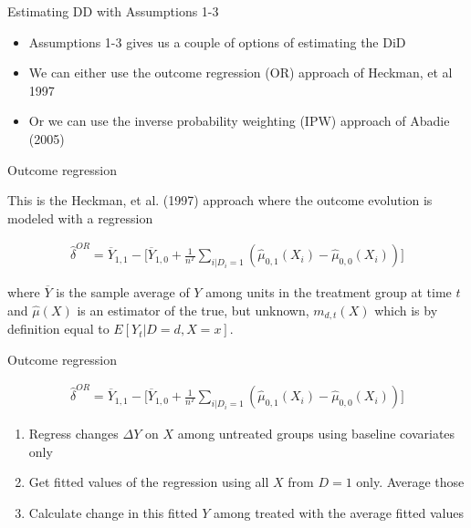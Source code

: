 \documentclass{beamer}
\begin{document}
\begin{frame}{Estimating DD with Assumptions 1-3}

\begin{itemize}
\item Assumptions 1-3 gives us a couple of options of estimating the DiD
\item We can either use the outcome regression (OR) approach of Heckman, et al 1997
\item Or we can use the inverse probability weighting (IPW) approach of Abadie (2005)
\end{itemize}

\end{frame}


\begin{frame}{Outcome regression}

This is the Heckman, et al. (1997) approach where the outcome evolution is modeled with a regression

\bigskip

\begin{eqnarray*}
\widehat{\delta}^{OR} = \overline{Y}_{1,1} - \bigg [ \overline{Y}_{1,0} + \frac{1}{n^T} \sum_{i|D_i=1} ( \widehat{\mu}_{0,1}(X_i) - \widehat{\mu}_{0,0}(X_i)) \bigg ]
\end{eqnarray*}

where $\overline{Y}$ is the sample average of $Y$ among units in the treatment group at time $t$ and $\widehat{\mu}(X)$ is an estimator of the true, but unknown, $m_{d,t}(X)$ which is by definition equal to $E[Y_t|D=d,X=x]$.

\end{frame}




\begin{frame}{Outcome regression}

\begin{eqnarray*}
\widehat{\delta}^{OR} = \overline{Y}_{1,1} - \bigg [ \overline{Y}_{1,0} + \frac{1}{n^T} \sum_{i|D_i=1} ( \widehat{\mu}_{0,1}(X_i) - \widehat{\mu}_{0,0}(X_i)) \bigg ]
\end{eqnarray*}

\begin{enumerate}
\item Regress changes $\Delta Y$ on $X$ among untreated groups using baseline covariates only
\item Get fitted values of the regression using all $X$ from $D=1$ only.  Average those
\item Calculate change in this fitted $Y$ among treated with the average fitted values
\end{enumerate}

\end{frame}
\end{document}
